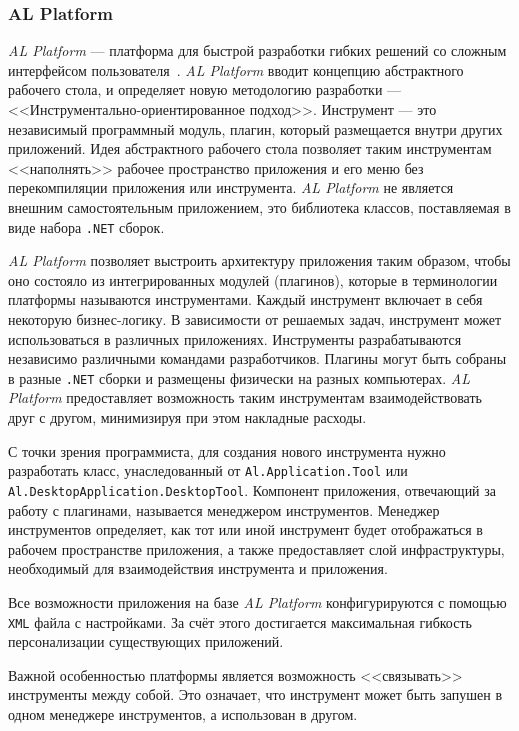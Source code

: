 \subsubsection{AL Platform}

{\it AL Platform} --- платформа для быстрой разработки гибких решений со сложным интерфейсом пользователя~\cite{alplatform-website}. {\it AL Platform} вводит концепцию абстрактного рабочего стола, и определяет новую методологию разработки --- <<Инструментально-ориентированное подход>>. Инструмент --- это независимый программный модуль, плагин, который размещается внутри других приложений. Идея абстрактного рабочего стола позволяет таким инструментам <<наполнять>> рабочее пространство приложения и его меню без перекомпиляции приложения или инструмента. {\it AL Platform} не является внешним самостоятельным приложением, это библиотека классов, поставляемая в виде набора {\tt .NET} сборок. 

{\it AL Platform} позволяет выстроить архитектуру приложения таким образом, чтобы оно состояло из интегрированных модулей (плагинов), которые в терминологии платформы называются инструментами. Каждый инструмент включает в себя некоторую бизнес-логику. В зависимости от решаемых задач, инструмент может использоваться в различных приложениях. Инструменты разрабатываются независимо различными командами разработчиков. Плагины могут быть собраны в разные {\tt .NET} сборки и размещены физически на разных компьютерах. {\it AL Platform} предоставляет возможность таким инструментам взаимодействовать друг с другом, минимизируя при этом накладные расходы.

С точки зрения программиста, для создания нового инструмента нужно разработать класс, унаследованный от {\tt Al.Application.Tool} или {\tt Al.DesktopApplication.DesktopTool}. Компонент приложения, отвечающий за работу с плагинами, называется менеджером инструментов. Менеджер инструментов определяет, как тот или иной инструмент будет отображаться в рабочем пространстве приложения, а также предоставляет слой инфраструктуры, необходимый для взаимодействия инструмента и приложения. 

Все возможности приложения на базе {\it AL Platform} конфигурируются с помощью {\tt XML} файла с настройками. За счёт этого достигается максимальная гибкость персонализации существующих приложений.

Важной особенностью платформы является возможность <<связывать>> инструменты между собой. Это означает, что инструмент может быть запушен в одном менеджере инструментов, а использован в другом.